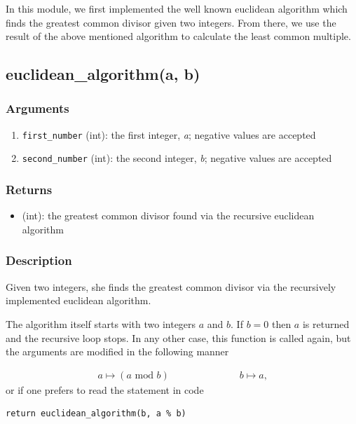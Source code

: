 \documentclass[refman]{scrartcl}
\newcommand{\mymod}{\text{\ \ mod\ \ }}
\begin{document}
In this module, we first implemented the well known euclidean algorithm which finds the greatest common divisor given two integers. From there, we use the result of the above mentioned algorithm to calculate the least common multiple.

\subsection{euclidean\_algorithm(a, b)}

\subsubsection*{Arguments}

\begin{enumerate}
  \item \texttt{first\_number} (int): the first integer, \textit{a}; negative values are accepted
  \item \texttt{second\_number} (int): the second integer, \textit{b}; negative values are accepted
\end{enumerate}

\subsubsection*{Returns}

\begin{itemize}
  \item (int): the greatest common divisor found via the recursive euclidean algorithm
\end{itemize}

\subsubsection*{Description}

Given two integers, she finds the greatest common divisor via the recursively implemented euclidean algorithm.

The algorithm itself starts with two integers \(a\) and \(b\). If \(b = 0\) then \(a\) is returned and the recursive loop stops. In any other case, this function is called again, but the arguments are modified in the following manner

\begin{align*}
	a \mapsto (a \mymod b) \hspace{3cm} b \mapsto a \text{,}
\end{align*}
%
or if one prefers to read the statement in code
%
\begin{lstlisting}
return euclidean_algorithm(b, a % b)
\end{lstlisting}
\end{document}
